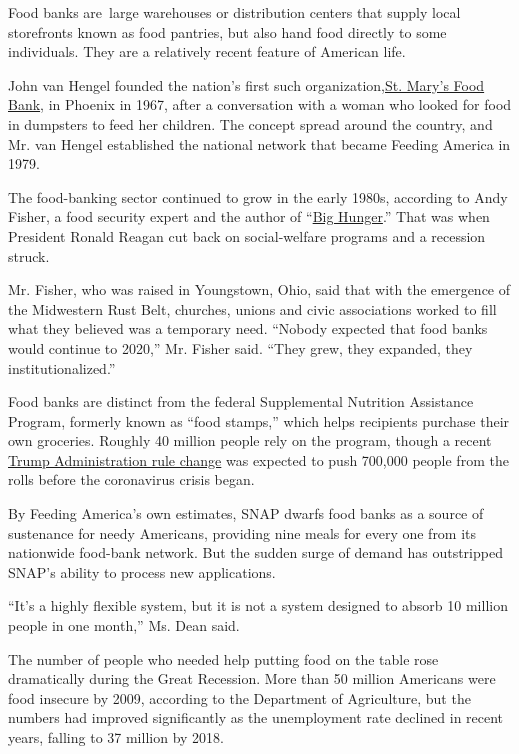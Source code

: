 Food banks are~large warehouses or distribution centers that supply
local storefronts known as food pantries, but also hand food directly to
some individuals. They are a relatively recent feature of American life.

John van Hengel founded the nation's first such
organization,\href{https://www.firstfoodbank.org/about/}{St. Mary's Food
Bank}, in Phoenix in 1967, after a conversation with a woman who looked
for food in dumpsters to feed her children. The concept spread around
the country, and Mr. van Hengel established the national network that
became Feeding America in 1979.

The food-banking sector continued to grow in the early 1980s, according
to Andy Fisher, a food security expert and the author of
``\href{https://www.bighunger.org/}{Big Hunger}.'' That was when
President Ronald Reagan cut back on social-welfare programs and a
recession struck.

Mr. Fisher, who was raised in Youngstown, Ohio, said that with the
emergence of the Midwestern Rust Belt, churches, unions and civic
associations worked to fill what they believed was a temporary need.
``Nobody expected that food banks would continue to 2020,'' Mr. Fisher
said. ``They grew, they expanded, they institutionalized.''

Food banks are distinct from the federal Supplemental Nutrition
Assistance Program, formerly known as ``food stamps,'' which helps
recipients purchase their own groceries. Roughly 40 million people rely
on the program, though a recent
\href{https://www.nytimes3xbfgragh.onion/2020/01/25/us/politics/trumps-food-stamp-cuts.html}{Trump
Administration rule change} was expected to push 700,000 people from the
rolls before the coronavirus crisis began.

By Feeding America's own estimates, SNAP dwarfs food banks as a source
of sustenance for needy Americans, providing nine meals for every one
from its nationwide food-bank network. But the sudden surge of demand
has outstripped SNAP's ability to process new applications.

``It's a highly flexible system, but it is not a system designed to
absorb 10 million people in one month,'' Ms. Dean said.

The number of people who needed help putting food on the table rose
dramatically during the Great Recession. More than 50 million Americans
were food insecure by 2009, according to the Department of Agriculture,
but the numbers had improved significantly as the unemployment rate
declined in recent years, falling to 37 million by 2018.

